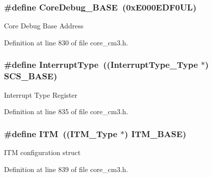 \hypertarget{group___c_m_s_i_s__core__register_ga680604dbcda9e9b31a1639fcffe5230b}{
\subsubsection[{\-Core\-Debug\-\_\-\-B\-A\-S\-E}]{\setlength{\rightskip}{0pt plus 5cm}\#define {\bf \-Core\-Debug\-\_\-\-B\-A\-S\-E}~(0x\-E000\-E\-D\-F0\-U\-L)}}\label{group___c_m_s_i_s__core__register_ga680604dbcda9e9b31a1639fcffe5230b}
\-Core \-Debug \-Base \-Address 

\-Definition at line 830 of file core\-\_\-cm3.\-h.

\hypertarget{group___c_m_s_i_s__core__register_ga164238adbad56f07c7dd4e912af748dd}{
\subsubsection[{\-Interrupt\-Type}]{\setlength{\rightskip}{0pt plus 5cm}\#define {\bf \-Interrupt\-Type}~(({\bf \-Interrupt\-Type\-\_\-\-Type} $\ast$) {\bf \-S\-C\-S\-\_\-\-B\-A\-S\-E})}}\label{group___c_m_s_i_s__core__register_ga164238adbad56f07c7dd4e912af748dd}
\-Interrupt \-Type \-Register 

\-Definition at line 835 of file core\-\_\-cm3.\-h.

\hypertarget{group___c_m_s_i_s__core__register_gabae7cdf882def602cb787bb039ff6a43}{
\subsubsection[{\-I\-T\-M}]{\setlength{\rightskip}{0pt plus 5cm}\#define {\bf \-I\-T\-M}~(({\bf \-I\-T\-M\-\_\-\-Type} $\ast$)           {\bf \-I\-T\-M\-\_\-\-B\-A\-S\-E})}}\label{group___c_m_s_i_s__core__register_gabae7cdf882def602cb787bb039ff6a43}
\-I\-T\-M configuration struct 

\-Definition at line 839 of file core\-\_\-cm3.\-h.

